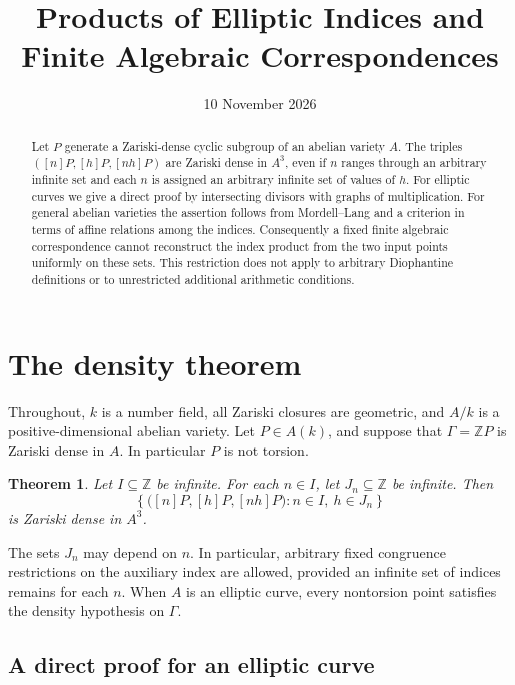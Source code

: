 \documentclass[11pt,a4paper]{article}
\title{Products of Elliptic Indices and Finite Algebraic Correspondences}
\author{}\date{10 November 2026}
\newtheorem{theorem}{Theorem}[section]
\theoremstyle{remark}\newtheorem{remark}[theorem]{Remark}
\newcommand{\Z}{\mathbb Z}\newcommand{\Q}{\mathbb Q}
\begin{document}
\maketitle
\begin{abstract}
Let \(P\) generate a Zariski-dense cyclic subgroup of an abelian
variety \(A\). The triples
\(( [n]P,[h]P,[nh]P )\) are Zariski dense in \(A^3\), even if
\(n\) ranges through an arbitrary infinite set and each \(n\)
is assigned an arbitrary infinite set of values of \(h\).
For elliptic curves we give a direct proof by intersecting
divisors with graphs of multiplication. For general abelian
varieties the assertion follows from Mordell--Lang and a
criterion in terms of affine relations among the indices.
Consequently a fixed finite algebraic correspondence cannot
reconstruct the index product from the two input points
uniformly on these sets. This restriction does not apply to
arbitrary Diophantine definitions or to unrestricted additional
arithmetic conditions.
\end{abstract}

\section{The density theorem}

Throughout, \(k\) is a number field, all Zariski closures are
geometric, and \(A/k\) is a positive-dimensional abelian
variety. Let \(P\in A(k)\), and suppose that
\(\Gamma=\Z P\) is Zariski dense in \(A\).
In particular \(P\) is not torsion.

\begin{theorem}\label{thm:product}
Let \(I\subseteq\Z\) be infinite. For each \(n\in I\), let
\(J_n\subseteq\Z\) be infinite. Then
\[
 \left\{\bigl([n]P,[h]P,[nh]P\bigr):
                 n\in I,\ h\in J_n\right\}
\]
is Zariski dense in \(A^3\).
\end{theorem}

The sets \(J_n\) may depend on \(n\). In particular, arbitrary
fixed congruence restrictions on the auxiliary index are allowed,
provided an infinite set of indices remains for each \(n\).
When \(A\) is an elliptic curve, every nontorsion point satisfies
the density hypothesis on \(\Gamma\).

\subsection{A direct proof for an elliptic curve}
\end{document}
